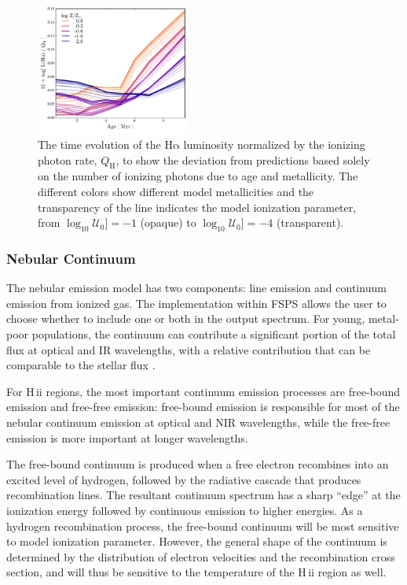 \documentclass[twocolumn, tighten]{aastex61}
\newcommand{\FSPS}{{\sc FSPS}\xspace}
\newcommand{\logten}{\ensuremath{\log_{10}}}
\newcommand{\ha}{\ensuremath{\mathrm{H\alpha}}}
\newcommand{\hii}{H\,{\sc ii}\xspace}
\newcommand{\QH}{\ensuremath{Q_{\mathrm{H}}}}
\newcommand{\logU}{\ensuremath{\logten \mathcal{U}_0}}
\begin{document}
\begin{figure} %
  \begin{centering}
    \includegraphics[width=0.45\textwidth]{f9.pdf}
    \caption{The time evolution of the \ha{} luminosity normalized by the ionizing photon rate, \QH{}, to show the deviation from predictions based solely on the number of ionizing photons due to age and metallicity. The different colors show different model metallicities and the transparency of the line indicates the model ionization parameter, from $\logU]=-1$ (opaque) to $\logU]=-4$ (transparent).}
    \label{fig:RecLines}
  \end{centering}
\end{figure}

\subsubsection{Nebular Continuum}\label{sec:models:continuum}

The nebular emission model has two components: line emission and continuum emission from ionized gas. The implementation within \FSPS allows the user to choose whether to include one or both in the output spectrum. For young, metal-poor populations, the continuum can contribute a significant portion of the total flux at optical and IR wavelengths, with a relative contribution that can be comparable to the stellar flux \citep[e.g.,][]{Reines10}. 

For \hii regions, the most important continuum emission processes are free-bound emission and free-free emission: free-bound emission is responsible for most of the nebular continuum emission at optical and NIR wavelengths, while the free-free emission is more important at longer wavelengths. 

The free-bound continuum is produced when a free electron recombines into an excited level of hydrogen, followed by the radiative cascade that produces recombination lines. The resultant continuum spectrum has a sharp ``edge'' at the ionization energy followed by continuous emission to higher energies. As a hydrogen recombination process, the free-bound continuum will be most sensitive to model ionization parameter. However, the general shape of the continuum is determined by the distribution of electron velocities and the recombination cross section, and will thus be sensitive to the temperature of the \hii region as well.
\end{document}
